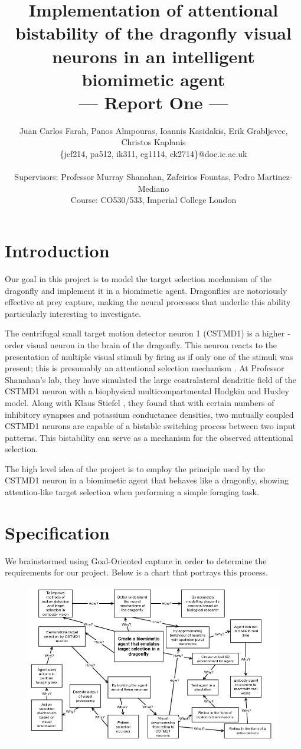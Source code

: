 \documentclass[a4paper,11pt]{article}
\title{Implementation of attentional bistability of the dragonfly visual neurons in an intelligent biomimetic agent\\\Large{--- Report One ---}}
\author{Juan Carlos Farah, Panos Almpouras, Ioannis Kasidakis, Erik Grabljevec, Christos Kaplanis\\
       \{jcf214, pa512, ik311, eg1114, ck2714\}@doc.ic.ac.uk\\ \\
       \small{Supervisors: Professor Murray Shanahan, Zafeirios Fountas, Pedro Martinez-Mediano}\\
       \small{Course: CO530/533, Imperial College London}
}
\begin{document}
\maketitle

\section{Introduction}

Our goal in this project is to model the target selection mechanism of the dragonfly and implement it in a biomimetic agent. Dragonflies are notoriously effective at prey capture, making the neural processes that underlie this ability particularly interesting to investigate. 

The centrifugal small ­target motion detector neuron 1 (CSTMD1) is a higher ­order visual neuron in the brain of the dragonfly. This neuron reacts to the presentation of multiple visual stimuli by firing as if only one of the stimuli was present; this is presumably an attentional selection mechanism \cite{w13}. At Professor Shanahan's lab, they have simulated the large contralateral dendritic field of the CSTMD1 neuron with a biophysical multi­compartmental Hodgkin and Huxley model. Along with Klaus Stiefel \cite{ne13}, they found that with certain numbers of inhibitory synapses and potassium conductance densities, two mutually coupled CSTMD1 neurons are capable of a bistable switching process between two input patterns. This bistability can serve as a mechanism for the observed attentional selection.

The high­ level idea of the project is to employ the principle used by the CSTMD1 neuron in a biomimetic agent that behaves like a dragonfly, showing attention-­like target selection when performing a simple foraging task.

\section{Specification}
We brainstormed using Goal-Oriented capture in order to determine the requirements for our project. Below is a chart that portrays this process.	
		
	
	\begin{figure}
	\begin{center}
	\includegraphics[scale = 0.5]{goalorient}
	\end{center}
	\end{figure}	
	
\end{document}
